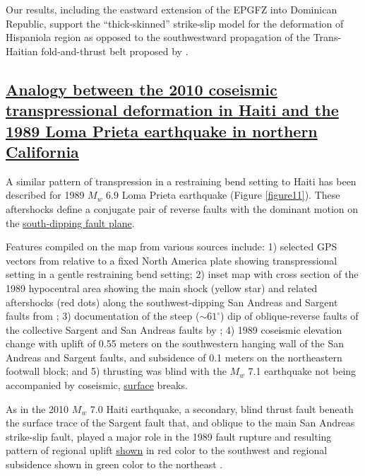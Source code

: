 \documentclass[linenumbers,draft]{agujournal}
\begin{document}
Our results, including the eastward extension of the EPGFZ into Dominican Republic, support the ``thick-skinned'' strike-slip model for the deformation of Hispaniola region as opposed to the southwestward propagation of the Trans-Haitian fold-and-thrust belt proposed by \citet{pubellier2000plate}. 

\subsection{\ul{Analogy between the 2010 coseismic transpressional deformation in Haiti and the 1989 Loma Prieta earthquake in northern California}}
A similar pattern of transpression in a restraining bend setting to Haiti has been described for 1989 $M_w$ 6.9 Loma Prieta earthquake \citep{marshall1991faulting} (Figure \ref{figure11}). These aftershocks define a conjugate pair of reverse faults with the dominant motion on the \ul{south-dipping fault plane}.

Features compiled on the map from various sources include: 1) selected GPS vectors from \citet{UNAVCO2009} relative to a fixed North America plate showing transpressional setting in a gentle restraining bend setting; 2) inset map with cross section of the 1989 hypocentral area showing the main shock (yellow star) and related aftershocks (red dots) along the southwest-dipping San Andreas and Sargent faults from \citet{marshall1991faulting}; 3) documentation of the steep ($\sim61^{\circ}$) dip of oblique-reverse faults of the collective Sargent and San Andreas faults by \citet{marshall1991faulting}; 4) 1989 coseismic elevation change with uplift of 0.55 meters on the southwestern hanging wall of the San Andreas and Sargent faults, and subsidence of 0.1 meters on the northeastern footwall block; and 5) thrusting was blind with the $M_w$ 7.1 earthquake not being accompanied by coseismic, \ul{surface} breaks. 

As in the 2010 $M_w$ 7.0 Haiti earthquake, a secondary, blind thrust fault beneath the surface trace of the Sargent fault that, and oblique to the main San Andreas strike-slip fault, played a major role in the 1989 fault rupture and resulting pattern of regional uplift \ul{shown} in red color to the southwest and regional subsidence shown in green color to the northeast \citep{olson1990seismicity}.
\end{document}
